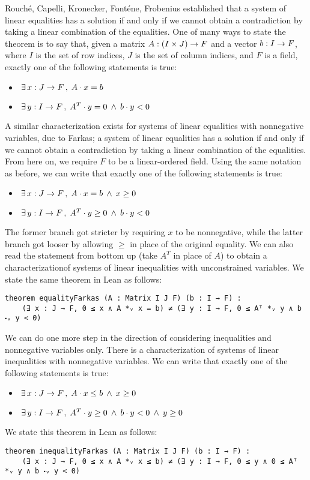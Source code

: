 \documentclass[]{article}
\DeclareMathOperator{\aand}{\;\wedge\;}
\DeclareMathOperator{\st}{,\;}
\DeclareMathOperator{\ex}{\,\exists}
\begin{document}
Rouché, Capelli, Kronecker, Fonténe, Frobenius established that
a system of linear equalities has a solution if and only if
we cannot obtain a contradiction by taking a linear combination of the equalities.
One of many ways to state the theorem is to say that, given a matrix $A : (I \times J) \rightarrow F$
and a vector $b : I \rightarrow F$, where $I$ is the set of row indices, $J$ is the set of column indices,
and $F$ is a field, exactly one of the following statements is true:
\begin{itemize}
	\item $ \ex x : J \r F \st A \* x = b $
	\item $ \ex y : I \r F \st A^T \* y = 0 \aand b \* y < 0 $
\end{itemize}
A similar characterization exists for systems of linear equalities with nonnegative variables, due to Farkas;
a system of linear equalities has a solution if and only if we cannot obtain
a contradiction by taking a linear combination of the equalities.
From here on, we require $F$ to be a linear-ordered field.
Using the same notation as before, we can write that exactly one of the following statements is true:
\begin{itemize}
	\item $ \ex x : J \r F \st A \* x = b \aand x \ge 0 $
	\item $ \ex y : I \r F \st A^T \* y \ge 0 \aand b \* y < 0 $
\end{itemize}
The former branch got stricter by requiring $x$ to be nonnegative, while the latter branch
got looser by allowing $\ge$ in place of the original equality.
We can also read the statement from bottom up (take $A^T$ in place of $A$) to obtain
a characterizationof systems of linear inequalities with unconstrained variables.
We state the same theorem in Lean as follows:
\begin{lstlisting}
theorem equalityFarkas (A : Matrix I J F) (b : I → F) :
    (∃ x : J → F, 0 ≤ x ∧ A *ᵥ x = b) ≠ (∃ y : I → F, 0 ≤ Aᵀ *ᵥ y ∧ b ⬝ᵥ y < 0)
\end{lstlisting}
We can do one more step in the direction of considering inequalities and nonnegative variables only.
There is a characterization of systems of linear inequalities with nonnegative variables.
We can write that exactly one of the following statements is true:
\begin{itemize}
	\item $ \ex x : J \r F \st A \* x \le b \aand x \ge 0 $
	\item $ \ex y : I \r F \st A^T \* y \ge 0 \aand b \* y < 0 \aand y \ge 0$
\end{itemize}
We state this theorem in Lean as follows:
\begin{lstlisting}
theorem inequalityFarkas (A : Matrix I J F) (b : I → F) :
    (∃ x : J → F, 0 ≤ x ∧ A *ᵥ x ≤ b) ≠ (∃ y : I → F, 0 ≤ y ∧ 0 ≤ Aᵀ *ᵥ y ∧ b ⬝ᵥ y < 0)
\end{lstlisting}
\end{document}
